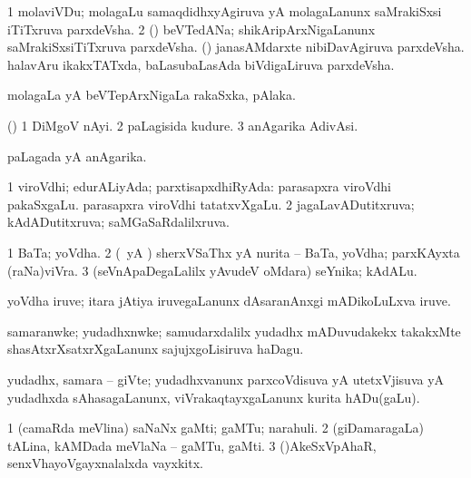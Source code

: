\bentry
{} 
\gl{\nA}
\expl{}
\bmng
\bnum
\num{1} molaviVDu; molagaLu samaqdidhxyAgiruva yA molagaLanunx saMrakiSxsi iTiTxruva parxdeVsha. 
\num{2} (\ca) beVTedANa; shikAripArxNigaLanunx saMrakiSxsiTiTxruva parxdeVsha. 
 (\rUpa) 
\banum
{} janasAMdarxte nibiDavAgiruva parxdeVsha. 
 halavAru ikakxTATxda, baLasubaLasAda biVdigaLiruva parxdeVsha. 
\eanum
\numie
\enum
\emng
\eentry

\bentry
{} 
\gl{\nA}
\expl{}
\bmng
molagaLa yA beVTepArxNigaLa rakaSxka, pAlaka. 
\emng
\eentry

\bentry
{} 
\gl{\nA}
\expl{}
\bmng
(\AseTxrXV) 
\bnum
\num{1} DiMgoV nAyi. 
\num{2} paLagisida kudure. 
\num{3} anAgarika AdivAsi. 
\enum
\emng
\eentry

\bentry
{} 
\gl{\gu}
\expl{}
\bmng
paLagada yA anAgarika. 
\emng
\eentry

\bentry
{} 
\gl{\gu}
\expl{}
\bmng
\bnum
\num{1} viroVdhi; edurALiyAda; parxtisapxdhiRyAda:  parasapxra viroVdhi pakaSxgaLu.  parasapxra viroVdhi tatatxvXgaLu. 
\num{2} jagaLavADutitxruva; kAdADutitxruva; saMGaSaRdalilxruva. 
\enum
\emng
\eentry

\bentry
{} 
\gl{\nA}
\expl{}
\bmng
\bnum
\num{1} BaTa; yoVdha. 
\num{2} (\rUpa\ yA \kAparx) sherxVSaThx yA nurita -- BaTa, yoVdha; parxKAyxta (raNa)viVra. 
\num{3} (seVnApaDegaLalilx yAvudeV oMdara) seYnika; kAdALu. 
\enum
\emng
\eentry

\bentry
{} 
\gl{\nA}
\expl{}
\bmng
yoVdha iruve; itara jAtiya iruvegaLanunx dAsaranAnxgi mADikoLuLxva iruve. 
\emng
\eentry

\bentry
{} 
\gl{\nA}
\expl{}
\bmng
samaranwke; yudadhxnwke; samudarxdalilx yudadhx mADuvudakekx takakxMte shasAtxrXsatxrXgaLanunx sajujxgoLisiruva haDagu. 
\emng
\eentry

\bentry
{} 
\gl{\nA}
\expl{}
\bmng
yudadhx, samara -- giVte; yudadhxvanunx parxcoVdisuva yA utetxVjisuva yA yudadhxda sAhasagaLanunx, viVrakaqtayxgaLanunx kurita hADu(gaLu). 
\emng
\eentry

\bentry
{} 
\gl{\nA}
\expl{}
\bmng
\bnum
\num{1} (camaRda meVlina) saNaNx gaMti; gaMTu; narahuli. 
\num{2} (giDamaragaLa) tALina, kAMDada meVlaNa -- gaMTu, gaMti. 
\num{3} (\AmA)AkeSxVpAhaR, senxVhayoVgayxnalalxda vayxkitx. 
\enum
\emng

